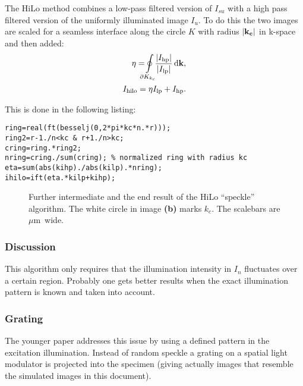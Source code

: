 \documentclass[11pt,abstracton,titlepage]{scrartcl}
\newcommand{\abs}[1]{\left| #1 \right|}
\renewcommand{\v }[1]{\bf #1}
\begin{document}
The HiLo method combines a low-pass filtered version of $I_{su}$ with
a high pass filtered version of the uniformly illuminated image $I_u$.
To do this the two images are scaled for a seamless interface along
the circle $K$ with radius $\abs{\v k_c}$ in k-space and then added:
\begin{align}
  \eta=\!\!\!\!\ointop_{\partial K_{k_c}}\!\!\!
  \frac{\abs{I_\textrm{hp}}}{\abs{I_\textrm{lp}}}\,\textrm{d}\v k,\\
  I_\textrm{hilo}=\eta I_\textrm{lp}+I_\textrm{hp}.
\end{align}

This is done in the following listing:
\begin{lstlisting}
ring=real(ft(besselj(0,2*pi*kc*n.*r)));
ring2=r-1./n<kc & r+1./n>kc;
cring=ring.*ring2;
nring=cring./sum(cring); % normalized ring with radius kc
eta=sum(abs(kihp)./abs(kilp).*nring);
ihilo=ift(eta.*kilp+kihp);
\end{lstlisting}

\begin{figure}[htb]
  \centering
  \caption{Further intermediate and the end result of the HiLo ``speckle'' algorithm. The white circle in image {\bf (b)} marks $k_c$. The scalebars are \unit[2]{$\mu$m} wide.}
  \label{fig:hilo1interm2}
\end{figure}

\subsubsection*{Discussion}
This algorithm only requires that the illumination intensity in $I_n$
fluctuates over a certain region. Probably one gets better results
when the exact illumination pattern is known and taken into account.

\subsubsection{Grating}
The younger paper \cite{2009Santos} addresses this issue by using a
defined pattern in the excitation illumination. Instead of random
speckle a grating on a spatial light modulator is projected into the
specimen (giving actually images that resemble the simulated images in
this document).
\end{document}
